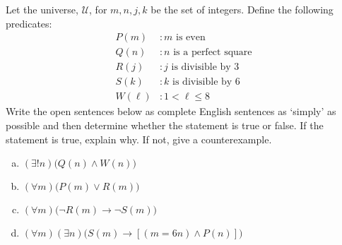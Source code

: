 \documentclass[11pt,letterpaper]{article}
\begin{document}

 Let the universe, $\mathcal{U}$, for $m, n, j, k$ be the set of integers. Define the following predicates:
	\[
	\begin{aligned}
	P(m) &\colon m \text{ is even} \\
	Q(n) &\colon n \text{ is a perfect square} \\
	R(j) &\colon j \text{ is divisible by 3} \\
	S(k) &\colon k \text{ is divisible by 6} \\
	W(\ell) &\colon 1 < \ell \leq 8
	\end{aligned}
	\]
Write the open sentences below as complete English sentences as `simply' as possible and then determine whether the statement is true or false. If the statement is true, explain why. If not, give a counterexample. 
	\begin{enumerate}[(a)]
	\item $(\exists! n) \big( Q(n) \wedge W(n) \big)$ 
	\item $(\forall m) \big( P(m) \vee R(m) \big)$ 
	\item $(\forall m) \big( \neg R(m) \to \neg S(m) \big)$ 
	\item $(\forall m) (\exists n) \big( S(m) \to [(m= 6n) \wedge P(n)] \big)$ 
	\end{enumerate} \pspace
\end{document}
